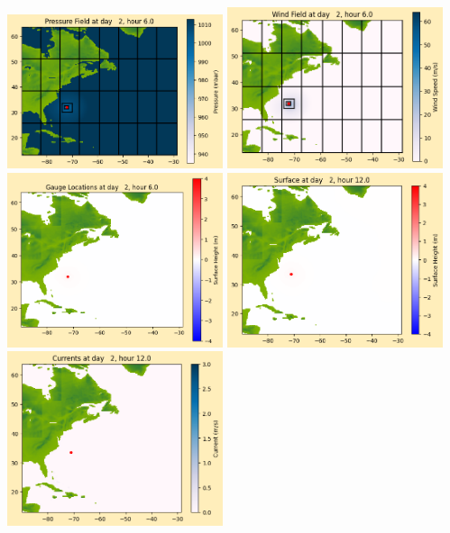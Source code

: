 \documentclass[11pt]{article}
\begin{document}
\includegraphics[width=0.475\textwidth]{frame0021fig1012.png}
\vskip 10pt 
\includegraphics[width=0.475\textwidth]{frame0021fig1013.png}
\includegraphics[width=0.475\textwidth]{frame0021fig1014.png}
\vskip 10pt 
\includegraphics[width=0.475\textwidth]{frame0022fig1001.png}
\includegraphics[width=0.475\textwidth]{frame0022fig1002.png}
\end{document}
